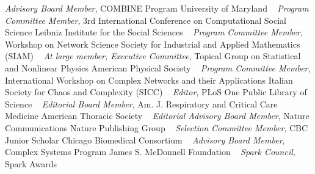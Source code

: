 \GapNoBreak
{}
\textit{Advisory Board Member}, COMBINE Program\newline
University of Maryland \newline
~
\Gap
{}
\textit{Program Committee Member}, 3rd International Conference on Computational Social Science\newline
Leibniz Institute for the Social Sciences \newline
~
\Gap
{}
\textit{Program Committee Member}, Workshop on Network Science\newline
Society for Industrial and Applied Mathematics (SIAM) \newline
~
\Gap
{}
\textit{At large member, Executive Committee}, Topical Group on Statistical and Nonlinear Physics\newline
American Physical Society \newline
~
\Gap
{}
\textit{Program Committee Member}, International Workshop on Complex Networks and their Applications\newline
Italian Society for Chaos and Complexity (SICC) \newline
~
\Gap
{}
\textit{Editor}, PLoS One\newline
Public Library of Science \newline
~
\Gap
{}
\textit{Editorial Board Member}, Am. J. Respiratory and Critical Care Medicine\newline
American Thoracic Society \newline
~
\Gap
{}
\textit{Editorial Advisory Board Member}, Nature Communications\newline
Nature Publishing Group \newline
~
\Gap
{}
\textit{Selection Committee Member}, CBC Junior Scholar\newline
Chicago Biomedical Consortium \newline
~
\Gap
{}
\textit{Advisory Board Member}, Complex Systems Program\newline
James S. McDonnell Foundation \newline
~
\Gap
{}
\textit{Spark Council}, Spark Awards\newline
